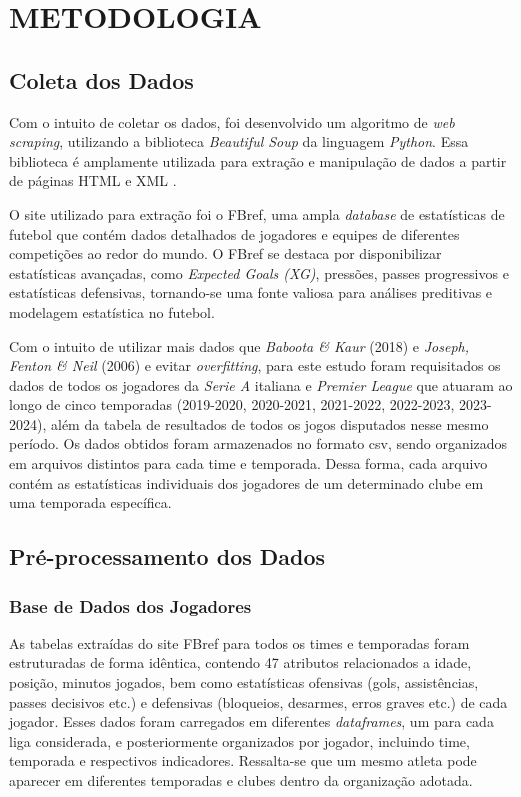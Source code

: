 \chapter{METODOLOGIA}

\section{Coleta dos Dados}

Com o intuito de coletar os dados, foi desenvolvido um algoritmo de \textit{web scraping}, utilizando a biblioteca \textit{Beautiful Soup} da linguagem \textit{Python}. Essa biblioteca é amplamente utilizada para extração e manipulação de dados a partir de páginas HTML e XML \cite{beautifulsoup}. 

O site utilizado para extração foi o FBref, uma ampla \textit{database} de estatísticas de futebol que contém dados detalhados de jogadores e equipes de diferentes competições ao redor do mundo. O FBref se destaca por disponibilizar estatísticas avançadas, como \textit{Expected Goals (XG)}, pressões, passes progressivos e estatísticas defensivas, tornando-se uma fonte valiosa para análises preditivas e modelagem estatística no futebol.

Com o intuito de utilizar mais dados que \textit{Baboota \& Kaur} (2018) e \textit{Joseph, Fenton \& Neil} (2006) e evitar \textit{overfitting}, para este estudo foram requisitados os dados de todos os jogadores da \textit{Serie A} italiana e \textit{Premier League} que atuaram ao longo de cinco temporadas (2019-2020, 2020-2021, 2021-2022, 2022-2023, 2023-2024), além da tabela de resultados de todos os jogos disputados nesse mesmo período. Os dados obtidos foram armazenados no formato csv, sendo organizados em arquivos distintos para cada time e temporada. Dessa forma, cada arquivo contém as estatísticas individuais dos jogadores de um determinado clube em uma temporada específica.

\section{Pré-processamento dos Dados}

\subsection{Base de Dados dos Jogadores}

As tabelas extraídas do site FBref para todos os times e temporadas foram estruturadas de forma idêntica, contendo 47 atributos relacionados a idade, posição, minutos jogados, bem como estatísticas ofensivas (gols, assistências, passes decisivos etc.) e defensivas (bloqueios, desarmes, erros graves etc.) de cada jogador. Esses dados foram carregados em diferentes \textit{dataframes}, um para cada liga considerada, e posteriormente organizados por jogador, incluindo time, temporada e respectivos indicadores. Ressalta-se que um mesmo atleta pode aparecer em diferentes temporadas e clubes dentro da organização adotada.

